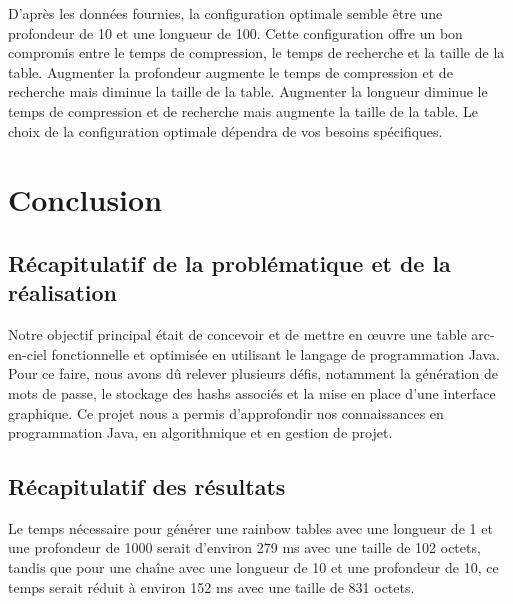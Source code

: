 \documentclass[a4paper,12pt]{article}
\begin{document}
D'après les données fournies, la configuration optimale semble être une profondeur de 10 et une longueur de 100. Cette configuration offre un bon compromis entre le temps de compression, le temps de recherche et la taille de la table. Augmenter la profondeur augmente le temps de compression et de recherche mais diminue la taille de la table. Augmenter la longueur diminue le temps de compression et de recherche mais augmente la taille de la table. Le choix de la configuration optimale dépendra de vos besoins spécifiques.

\section{Conclusion}

\subsection{Récapitulatif de la problématique et de la réalisation}
Notre objectif principal était de concevoir et de mettre en œuvre une table arc-en-ciel fonctionnelle et optimisée en utilisant le langage de programmation Java. Pour ce faire, nous avons dû relever plusieurs défis, notamment la génération de mots de passe, le stockage des hashs associés et la mise en place d'une interface graphique. Ce projet nous a permis d'approfondir nos connaissances en programmation Java, en algorithmique et en gestion de projet. 

\subsection{Récapitulatif des résultats}
Le temps nécessaire pour générer une rainbow tables avec une longueur de 1 et une profondeur de 1000 serait d'environ 279 ms avec une taille de 102 octets, tandis que pour une chaîne avec une longueur de 10 et une profondeur de 10, ce temps serait réduit à environ 152 ms avec une taille de 831 octets.
\end{document}
